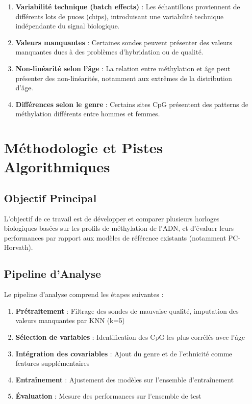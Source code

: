 \documentclass[11pt,a4paper]{article}
\begin{document}
\begin{enumerate}
    \item \textbf{Variabilité technique (batch effects)} : Les échantillons proviennent 
          de différents lots de puces (chips), introduisant une variabilité technique 
          indépendante du signal biologique.
    
    \item \textbf{Valeurs manquantes} : Certaines sondes peuvent présenter des valeurs 
          manquantes dues à des problèmes d'hybridation ou de qualité.
    
    \item \textbf{Non-linéarité selon l'âge} : La relation entre méthylation et âge 
          peut présenter des non-linéarités, notamment aux extrêmes de la distribution d'âge.
    
    \item \textbf{Différences selon le genre} : Certains sites CpG présentent des 
          patterns de méthylation différents entre hommes et femmes.
\end{enumerate}

\section{Méthodologie et Pistes Algorithmiques}

\subsection{Objectif Principal}

L'objectif de ce travail est de développer et comparer plusieurs horloges biologiques 
basées sur les profils de méthylation de l'ADN, et d'évaluer leurs performances par 
rapport aux modèles de référence existants (notamment PC-Horvath).

\subsection{Pipeline d'Analyse}

Le pipeline d'analyse comprend les étapes suivantes :

\begin{enumerate}
    \item \textbf{Prétraitement} : Filtrage des sondes de mauvaise qualité, 
          imputation des valeurs manquantes par KNN (k=5)
    \item \textbf{Sélection de variables} : Identification des CpG les plus 
          corrélés avec l'âge
    \item \textbf{Intégration des covariables} : Ajout du genre et de l'ethnicité 
          comme features supplémentaires
    \item \textbf{Entraînement} : Ajustement des modèles sur l'ensemble d'entraînement
    \item \textbf{Évaluation} : Mesure des performances sur l'ensemble de test
\end{enumerate}
\end{document}

